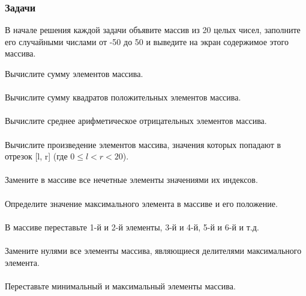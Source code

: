 \documentclass[PDF,10pt,usenames,dvipsnames,t,fragile]{beamer}
\newcommand{\bigqm}[1][1]{\text{\rm\larger[#1]{\textbf{?}}}}
\newcommand{\prblm}[1]{{\bigqm[1]} {#1 \\} \vspace{-6pt} \\} %
\begin{document}
\begin{frame}
	\frametitle{Задачи}
	В начале решения каждой задачи объявите массив из 20 целых чисел, заполните
	его случайными числами от -50 до 50 и выведите на экран содержимое этого
	массива.

	\prblm{Вычислите сумму элементов массива.}
	\prblm{Вычислите сумму квадратов положительных элементов массива.}
	\prblm{Вычислите среднее арифметическое отрицательных элементов массива.}
	\prblm{Вычислите произведение элементов массива, значения которых попадают в отрезок [l, r] (где $0 \leq l < r < 20$).}
	\prblm{Замените в массиве все нечетные элементы значениями их индексов.}
	\prblm{Определите значение максимального элемента в массиве и его положение.}
	\prblm{В массиве переставьте 1-й и 2-й элементы, 3-й и 4-й, 5-й и 6-й и т.д.}
	\prblm{Замените нулями все элементы массива, являющиеся делителями максимального элемента.}
	\prblm{Переставьте минимальный и максимальный элементы массива.}
\end{frame}
\end{document}
